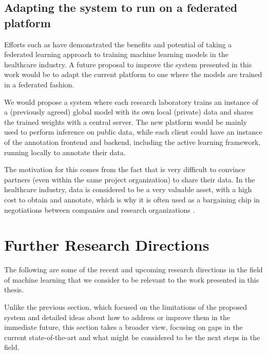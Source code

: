 \documentclass[../main.tex]{subfiles}
\begin{document}
    \subsection{Adapting the system to run on a federated platform} \label{conclusions:future_work:federated} 

    Efforts such as \cite{joshi_federated_2022} have demonstrated the benefits and potential of taking a federated learning approach to training machine learning models in the healthcare industry. A future proposal to improve the system presented in this work would be to adapt the current platform to one where the models are trained in a federated fashion.
    
    We would propose a system where each research laboratory trains an instance of a (previously agreed) global model with its own local (private) data and shares the trained weights with a central server. The new platform would be mainly used to perform inference on public data, while each client could have an instance of the annotation frontend and backend, including the active learning framework, running locally to annotate their data. 
    
    The motivation for this comes from the fact that is very difficult to convince partners (even within the same project organization) to share their data. In the healthcare industry, data is considered to be a very valuable asset, with a high cost to obtain and annotate, which is why it is often used as a bargaining chip in negotiations between companies and research organizations .


    \clearpage

    \section{Further Research Directions} \label{conclusions:research_directions} 

    The following are some of the recent and upcoming research directions in the field of machine learning that we consider to be relevant to the work presented in this thesis.
    
    Unlike the previous section, which focused on the limitations of the proposed system and detailed ideas about how to address or improve them in the immediate future, this section takes a broader view, focusing on gaps in the current state-of-the-art and what might be considered to be the next steps in the field.
    
\end{document}

